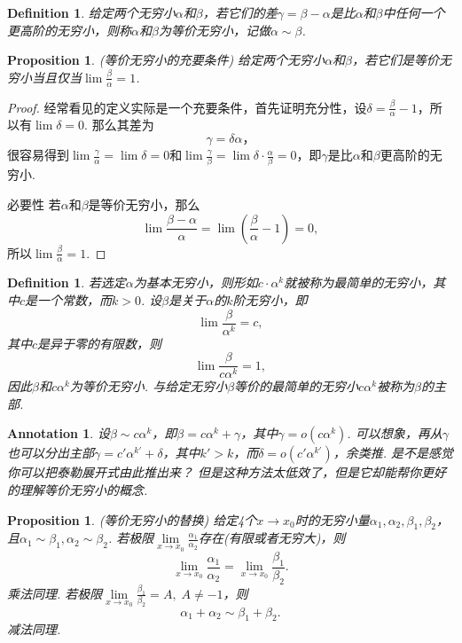 \documentclass{article}
\newtheorem{proposition}[theorem]{Proposition}
\newtheorem{definition}[theorem]{Definition}
\newtheorem{annotation}[theorem]{Annotation}
\begin{document}
\begin{definition}
\rm 给定两个无穷小$\alpha$和$\beta$，若它们的差$\gamma = \beta - \alpha$是比$\alpha$和$\beta$中任何一个更高阶的无穷小，则称$\alpha$和$\beta$为{\color{red}等价无穷小}，记做$\alpha \sim \beta$.
\end{definition}

\begin{proposition}
\rm {\color{red} (等价无穷小的充要条件)} 给定两个无穷小$\alpha$和$\beta$，若它们是等价无穷小当且仅当$\lim \frac{\beta}{\alpha} = 1$.
\end{proposition}

\begin{proof}
经常看见的定义实际是一个充要条件，首先证明{\color{blue}充分性}，设$\delta = \frac{\beta}{\alpha} - 1$，所以有$\lim \delta = 0$. 那么其差为
$$
\gamma = \delta \alpha，
$$
很容易得到$\lim \frac{\gamma}{\alpha} =\lim \delta = 0$和$\lim \frac{\gamma}{\beta} = \lim \delta\cdot\frac{\alpha}{\beta} = 0$，即$\gamma$是比$\alpha$和$\beta$更高阶的无穷小.

{\color{blue}必要性} 若$\alpha$和$\beta$是等价无穷小，那么
$$
\lim \frac{\beta-\alpha}{\alpha} = \lim (\frac{\beta}{\alpha} - 1) = 0,
$$
所以$\lim \frac{\beta}{\alpha} = 1$.
\end{proof}


\begin{definition}
\rm 若选定$\alpha$为基本无穷小，则形如$c\cdot \alpha^k$就被称为{\color{red}最简单的无穷小}，其中$c$是一个常数，而$k > 0$. 设$\beta$是关于$\alpha$的$k$阶无穷小，即
$$
\lim \frac{\beta}{\alpha^k} = c,
$$
其中$c$是异于零的有限数，则
$$
\lim \frac{\beta}{c\alpha^k} = 1,
$$
因此$\beta$和$c\alpha^k$为等价无穷小. 与给定无穷小$\beta$等价的最简单的无穷小$c\alpha^k$被称为$\beta$的{\color{red}主部}.
\end{definition}

\begin{annotation}
\rm 设$\beta \sim c\alpha^k$，即$\beta = c\alpha^k + \gamma$，其中$\gamma = o(c\alpha^k)$. 可以想象，再从$\gamma$也可以分出主部$\gamma = c'\alpha^{k'} + \delta$，其中$k' > k$，而$\delta = o(c'\alpha^{k'})$，余类推. {\color{blue}是不是感觉你可以把泰勒展开式由此推出来？ 但是这种方法太低效了，但是它却能帮你更好的理解等价无穷小的概念}.
\end{annotation}

\begin{proposition}
\rm {\color{red} (等价无穷小的替换) }给定4个$x \rightarrow x_0$时的无穷小量$\alpha_1,\alpha_2,\beta_1,\beta_2$，且$\alpha_1 \sim \beta_1, \alpha_2 \sim \beta_2$. 若极限$\lim\limits_{x \rightarrow x_0} \frac{\alpha_1}{\alpha_2}$存在(有限或者无穷大)，则
$$
\lim\limits_{x \rightarrow x_0} \frac{\alpha_1}{\alpha_2} = \lim\limits_{x \rightarrow x_0} \frac{\beta_1}{\beta_2}.
$$
乘法同理. 若极限$\lim\limits_{x \rightarrow x_0} \frac{\beta_1}{\beta_2} = A, \; A \neq -1$，则
$$
\alpha_1 + \alpha_2 \sim \beta_1 + \beta_2.
$$ 
减法同理.
\end{proposition}
\end{document}
